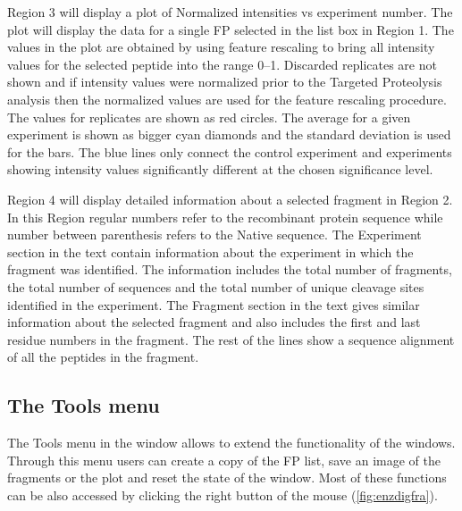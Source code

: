 Region \num{3} will display a plot of Normalized intensities vs experiment number. The plot will display the data for a single FP selected in the list box in Region \num{1}. The values in the plot are obtained by using feature rescaling to bring all intensity values for the selected peptide into the range \numrange{0}{1}. Discarded replicates are not shown and if intensity values were normalized prior to the Targeted Proteolysis analysis then the normalized values are used for the feature rescaling procedure. The values for replicates are shown as red circles. The average for a given experiment is shown as bigger cyan diamonds and the standard deviation is used for the bars. The blue lines only connect the control experiment and experiments showing intensity values significantly different at the chosen significance level.  

Region \num{4} will display detailed information about a selected fragment in Region \num{2}. In this Region regular numbers refer to the recombinant protein sequence while number between parenthesis refers to the Native sequence. The Experiment section in the text contain information about the experiment in which the fragment was identified. The information includes the total number of fragments, the total number of sequences and the total number of unique cleavage sites identified in the experiment. The Fragment section in the text gives similar information about the selected fragment and also includes the first and last residue numbers in the fragment. The rest of the lines show a sequence alignment of all the peptides in the fragment.

\subsection{The Tools menu}

The Tools menu in the window allows to extend the functionality of the windows. Through this menu users can create a copy of the FP list, save an image of the fragments or the plot and reset the state of the window. Most of these functions can be also accessed by clicking the right button of the mouse (\autoref{fig:enzdigfra}).